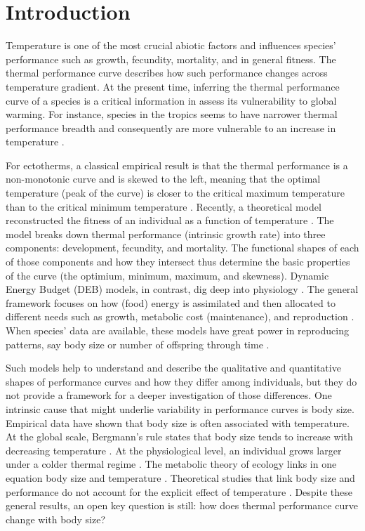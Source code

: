 \section*{Introduction}
Temperature is one of the most crucial abiotic factors and influences species' performance such as growth, fecundity, mortality, and in general fitness.
The thermal performance curve describes how such performance changes across temperature gradient.
At the present time, inferring the thermal performance curve of a species is a critical information in assess its vulnerability to global warming.
For instance, species in the tropics seems to have narrower thermal performance breadth and consequently are more vulnerable to an increase in temperature \citep{Deutsch2008}.

For ectotherms, a classical empirical result is that the thermal performance is a non-monotonic curve and is skewed to the left, meaning that the optimal temperature (peak of the curve) is closer to the critical maximum temperature than to the critical minimum temperature \citep[e.g.,][]{Angilletta2009}.
Recently, a theoretical model reconstructed the fitness of an individual as a function of temperature \citep{Amarasekare2012}.
The model breaks down thermal performance (intrinsic growth rate) into three components: development, fecundity, and mortality.
The functional shapes of each of those components and how they intersect thus determine the basic properties of the curve (the optimium, minimum, maximum, and skewness).
Dynamic Energy Budget (DEB) models, in contrast, dig deep into physiology \citep{Kooijman2009}.
The general framework focuses on how (food) energy is assimilated and then allocated to different needs such as growth, metabolic cost (maintenance), and reproduction \citep{Kooijman2009}.
When species'  data are available, these models have great power in reproducing patterns, say body size or number of offspring through time \citep{Nisbet2000}.

Such models help to understand and describe the qualitative and quantitative shapes of performance curves and how they differ among individuals, but they do not provide a framework for a deeper investigation of those differences.
One intrinsic cause that might underlie variability in performance curves is body size.
Empirical data have shown that body size is often associated with temperature.
At the global scale, Bergmann's rule states that body size tends to increase with decreasing temperature \citep{Bergmann1847}.
At the physiological level, an individual grows larger under a colder thermal regime \citep{Van1996}.
The metabolic theory of ecology links in one equation body size and temperature \citep{Gillooly2001}.
Theoretical studies that link body size and performance do not account for the explicit effect of temperature \citep[e.g.,][]{Yodzis1992, Brown1993}.
Despite these general results, an open key question is still: how does thermal performance curve change with body size?

